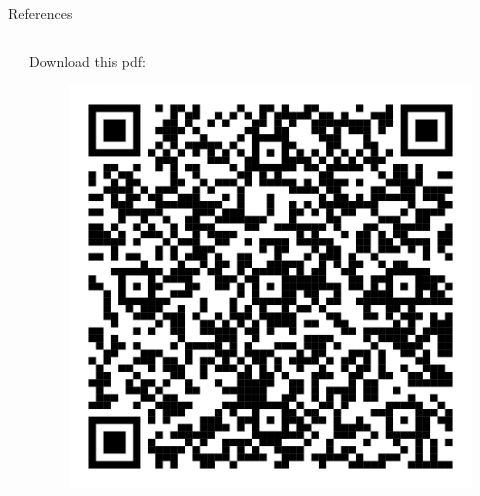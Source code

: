 \documentclass[aspectratio=169]{beamer}
\begin{document}
\begin{frame}{References}
\begin{columns}
\begin{column}{0.7\textwidth}
\printbibliography
\end{column}
\begin{column}{0.25\textwidth}
\centering
Download this pdf:
\begin{figure}
\includegraphics[width=1\textwidth]{pictures/download.png}
\end{figure}
\end{column}
\end{columns}
\end{frame}
\end{document}
